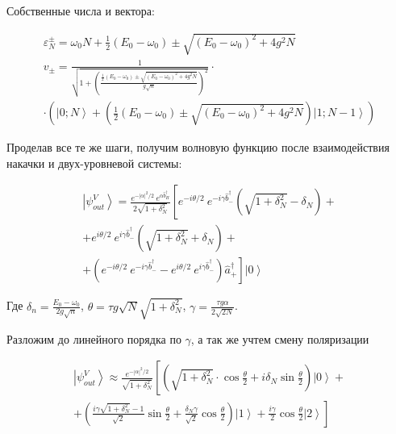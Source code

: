 \documentclass[11pt]{article}    %
\begin{document}
Собственные числа и вектора:

\begin{gather}
    \varepsilon^{\pm}_{N} = \omega_0 N + \frac{1}{2} \left( E_0 - \omega_0 \right) \pm \sqrt{\left( E_0 - \omega_0 \right)^2 + 4 g^2 N} \\ \nonumber
    v_{\pm} = \frac{1}{\sqrt{1+\left( \frac{\frac{1}{2} \left( E_0 - \omega_0 \right) \pm \sqrt{\left( E_0 - \omega_0 \right)^2 + 4 g^2 N}}{g\sqrt{n}} \right)^2 }} \cdot \\
    \cdot \left( \left|  0; N \right> + \left( \frac{1}{2} \left( E_0 - \omega_0 \right) \pm \sqrt{\left( E_0 - \omega_0 \right)^2 + 4 g^2 N} \right) \left| 1; N-1 \right> \right)
\end{gather}

Проделав все те же шаги, получим волновую функцию после взаимодействия накачки и двух-уровневой системы:

\begin{gather} \nonumber
    \left| \psi_{out}^V \right> = \frac{e^{-\left| \alpha \right|^2 / 2} \ e^{\alpha \hat{b}^{\dag}_{H}}}{2\sqrt{1+\delta_N^2}}  \left[ e^{-i \theta / 2 } \ e^{-i \gamma \hat{b}^{\dag}_{-} } \left( \sqrt{1+\delta_{N}^2} - \delta_N \right) \right. + \\ \nonumber
    + e^{i \theta / 2 } \ e^{i \gamma \hat{b}^{\dag}_{-} } \left( \sqrt{1+\delta_N^2} + \delta_N \right) + \\
    + \left. \left( e^{-i \theta / 2 } \ e^{-i \gamma \hat{b}^{\dag}_{-} } - e^{i \theta / 2 } \ e^{i \gamma \hat{b}^{\dag}_{-} } \right) \hat{a}^{\dag}_{+} \right] \left| 0 \right>
\end{gather}

Где $\delta_n = \frac{E_0 - \omega_0}{2g\sqrt{n}} $, $\theta = \tau g \sqrt{N}\sqrt{1+\delta_N^2} $, $\gamma = \frac{\tau g \alpha }{2\sqrt{2N}} $.

Разложим до линейного порядка по $\gamma$, а так же учтем смену поляризации

\begin{gather} \nonumber
    \left| \psi_{out}^V \right> \approx \frac{e^{-\left| \alpha \right|^2 / 2}}{\sqrt{1+\delta_N^2}} \left[ \left( \sqrt{1+\delta_N^2} \cdot \cos\frac{\theta}{2} + i \delta_N \sin\frac{\theta}{2}  \right) \left| 0 \right> + \right. \\
    \left. + \left( \frac{i \gamma \sqrt{1+\delta_N^2} - 1 }{\sqrt{2}} \sin\frac{\theta}{2} + \frac{\delta_N \gamma}{\sqrt{2}} \cos\frac{\theta}{2} \right) \left| 1 \right> +  \frac{i\gamma}{2} \cos\frac{\theta}{2} \left| 2 \right> \right]
\end{gather}
\end{document}
